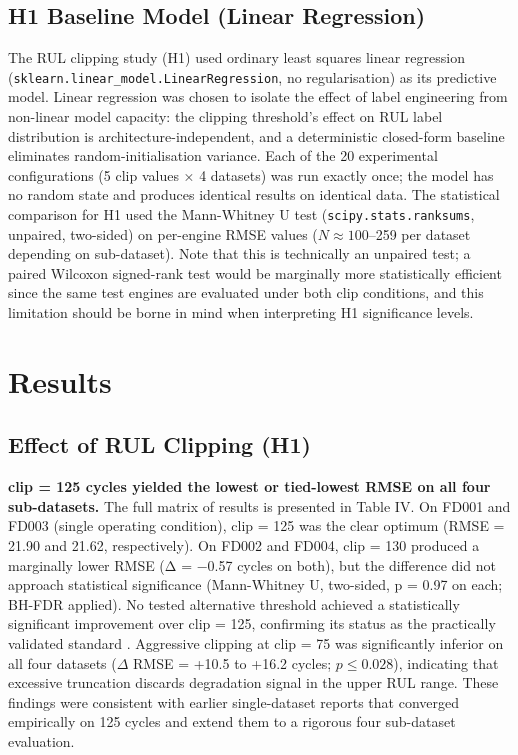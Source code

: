 \documentclass[review,12pt]{elsarticle}
\begin{document}
\subsection{H1 Baseline Model (Linear Regression)}

\begin{sloppypar}
The RUL clipping study (H1) used ordinary least squares linear regression (\texttt{sklearn.linear\_model.LinearRegression}, no regularisation) as its predictive model. Linear regression was chosen to isolate the effect of label engineering from non-linear model capacity: the clipping threshold's effect on RUL label distribution is architecture-independent, and a deterministic closed-form baseline eliminates random-initialisation variance. Each of the 20 experimental configurations (5 clip values × 4 datasets) was run exactly once; the model has no random state and produces identical results on identical data. The statistical comparison for H1 used the Mann-Whitney U test (\texttt{scipy.stats.ranksums}, unpaired, two-sided) on per-engine RMSE values ($N \approx 100$--259 per dataset depending on sub-dataset). Note that this is technically an unpaired test; a paired Wilcoxon signed-rank test would be marginally more statistically efficient since the same test engines are evaluated under both clip conditions, and this limitation should be borne in mind when interpreting H1 significance levels.
\end{sloppypar}

\section{Results}

\subsection{Effect of RUL Clipping (H1)}

\textbf{clip = 125 cycles yielded the lowest or tied-lowest RMSE on all four sub-datasets.} The full matrix of results is presented in Table IV. On FD001 and FD003 (single operating condition), clip = 125 was the clear optimum (RMSE = 21.90 and 21.62, respectively). On FD002 and FD004, clip = 130 produced a marginally lower RMSE (Δ = −0.57 cycles on both), but the difference did not approach statistical significance (Mann-Whitney U, two-sided, p = 0.97 on each; BH-FDR applied). No tested alternative threshold achieved a statistically significant improvement over clip = 125, confirming its status as the practically validated standard \cite{ref05,ref06}. Aggressive clipping at clip = 75 was significantly inferior on all four datasets ($\Delta$ RMSE = +10.5 to +16.2 cycles; $p \leq 0.028$), indicating that excessive truncation discards degradation signal in the upper RUL range. These findings were consistent with earlier single-dataset reports that converged empirically on 125 cycles \cite{ref05,ref06} and extend them to a rigorous four sub-dataset evaluation.
\end{document}
